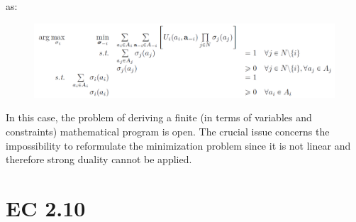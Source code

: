 as:
\begin{figure}[H]
\centering
\includegraphics[width=\textwidth]{images/img_2_9_06.png}
\end{figure}
\noindent
In this case, the problem of deriving a finite (in terms of variables and constraints) mathematical program
is open. The crucial issue concerns the impossibility to reformulate the minimization problem since it is not
linear and therefore strong duality cannot be applied.
\section{EC 2.10}

